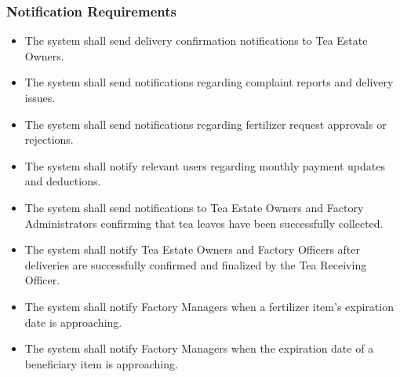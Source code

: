 \subsubsection{Notification Requirements}
\begin{itemize}
    \item The system shall send delivery confirmation notifications to Tea Estate Owners.
    \item The system shall send notifications regarding complaint reports and delivery issues.
    \item The system shall send notifications regarding fertilizer request approvals or rejections.
    \item The system shall notify relevant users regarding monthly payment updates and deductions.
    \item The system shall send notifications to Tea Estate Owners and Factory Administrators confirming that tea leaves have been successfully collected.
    \item The system shall notify Tea Estate Owners and Factory Officers after deliveries are successfully confirmed and finalized by the Tea Receiving Officer.
    \item The system shall notify Factory Managers when a fertilizer item's expiration date is approaching.
    \item The system shall notify Factory Managers when the expiration date of a beneficiary item is approaching.
\end{itemize}

